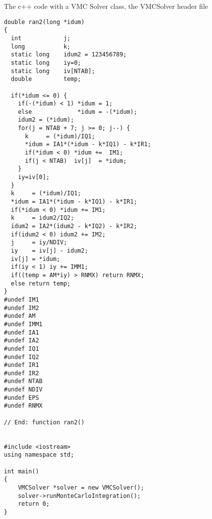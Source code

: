 \documentclass{beamer}
\begin{document}
\begin{frame}
\begin{block}{The c++ code with a VMC Solver class, the VMCSolver header file }
\begin{verbatim}
double ran2(long *idum)
{
  int            j;
  long           k;
  static long    idum2 = 123456789;
  static long    iy=0;
  static long    iv[NTAB];
  double         temp;

  if(*idum <= 0) {
    if(-(*idum) < 1) *idum = 1;
    else             *idum = -(*idum);
    idum2 = (*idum);
    for(j = NTAB + 7; j >= 0; j--) {
      k     = (*idum)/IQ1;
      *idum = IA1*(*idum - k*IQ1) - k*IR1;
      if(*idum < 0) *idum +=  IM1;
      if(j < NTAB)  iv[j]  = *idum;
    }
    iy=iv[0];
  }
  k     = (*idum)/IQ1;
  *idum = IA1*(*idum - k*IQ1) - k*IR1;
  if(*idum < 0) *idum += IM1;
  k     = idum2/IQ2;
  idum2 = IA2*(idum2 - k*IQ2) - k*IR2;
  if(idum2 < 0) idum2 += IM2;
  j     = iy/NDIV;
  iy    = iv[j] - idum2;
  iv[j] = *idum;
  if(iy < 1) iy += IMM1;
  if((temp = AM*iy) > RNMX) return RNMX;
  else return temp;
}
#undef IM1
#undef IM2
#undef AM
#undef IMM1
#undef IA1
#undef IA2
#undef IQ1
#undef IQ2
#undef IR1
#undef IR2
#undef NTAB
#undef NDIV
#undef EPS
#undef RNMX

// End: function ran2()


#include <iostream>
using namespace std;

int main()
{
    VMCSolver *solver = new VMCSolver();
    solver->runMonteCarloIntegration();
    return 0;
}
\end{verbatim}
\end{block}
\end{frame}
\end{document}

